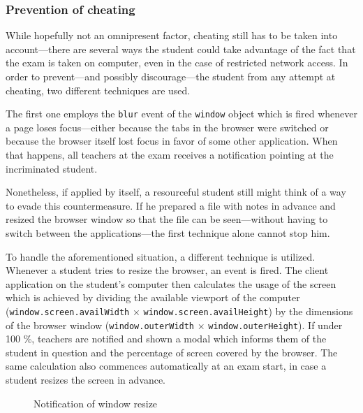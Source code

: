 \documentclass[thesis=M,english,hidelinks]{FITthesis}[2012/10/20]
\newcommand{\code}{\texttt}
\begin{document}
      \subsubsection{Prevention of cheating}

While hopefully not an omnipresent factor, cheating still has to be taken into account---there are several ways the student could take advantage of the fact that the exam is taken on computer, even in the case of restricted network access. In order to prevent---and possibly discourage---the student from any attempt at cheating, two different techniques are used.

The first one employs the \code{blur} event of the \code{window} object which is fired whenever a page loses focus---either because the tabs in the browser were switched or because the browser itself lost focus in favor of some other application. When that happens, all teachers at the exam receives a notification pointing at the incriminated student.

Nonetheless, if applied by itself, a resourceful student still might think of a way to evade this countermeasure. If he prepared a file with notes in advance and resized the browser window so that the file can be seen---without having to switch between the applications---the first technique alone cannot stop him.

To handle the aforementioned situation, a different technique is utilized. Whenever a student tries to resize the browser, an event is fired. The client application on the student's computer then calculates the usage of the screen which is achieved by dividing the available viewport of the computer (\code{window.screen.availWidth} × \code{window.screen.availHeight}) by the dimensions of the browser window (\code{window.outerWidth} × \code{window.outerHeight}). If under 100 \%, teachers are notified and shown a modal which informs them of the student in question and the percentage of screen covered by the browser. The same calculation also commences automatically at an exam start, in case a student resizes the screen in advance.



\begin{figure}
  \setlength\fboxsep{0pt}
  \setlength\fboxrule{0.2pt}
  \caption{Notification of window resize}
  \label{fig:cheating}
\end{figure}
\end{document}
